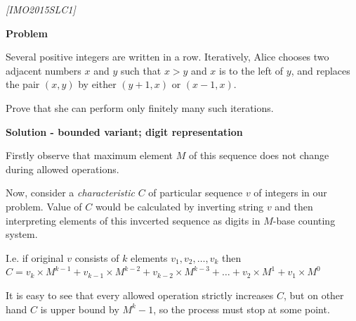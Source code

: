 \filbreak
\begin{problem}
\textit{[IMO2015SLC1]}

\textbf{Problem}

Several positive integers are written in a row. Iteratively, Alice chooses two adjacent numbers $x$ and $y$ such that $x > y$ and $x$ is to the left of $y$, and replaces the pair $(x,y)$ by either $(y + 1,x)$ or $(x − 1,x)$. 

Prove that she can perform only ﬁnitely many such iterations.

\textbf{Solution - bounded variant; digit representation }

Firstly observe that maximum element $M$ of this sequence  does not change during allowed operations.

Now, consider a \textit{characteristic} $C$ of particular sequence $v$ of integers in our problem. Value of $C$ would be calculated by inverting string $v$ and then interpreting elements of this invcerted sequence as digits in $M$-base counting system.

I.e. if original $v$ consists of $k$ elements $v_1, v_2, \dots, v_k$ then $C = v_k \times M^{k-1} + v_{k-1} \times M^{k-2} + v_{k-2}\times M^{k-3} + \dots + v_2 \times M^{1} + v_1 \times M^{0}$

It is easy to see that every allowed operation strictly increases $C$, but on other hand $C$ is upper bound by $M^k-1$, so the process must stop at some point.
\end{problem}
\filbreak

